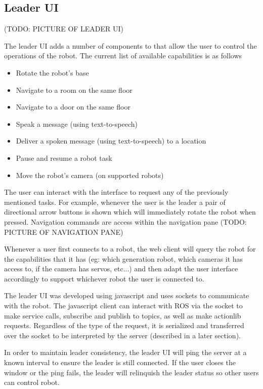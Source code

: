 \documentclass[
  oneside,
  11pt, a4paper,
  footinclude=true,
  headinclude=true,
  cleardoublepage=empty
]{article}
\begin{document}
\subsection{Leader UI}

(TODO: PICTURE OF LEADER UI)

The leader UI adds a number of components to that allow the user to
control the operations of the robot. The current list of available capabilities
is as follows

\begin{itemize}
  \item Rotate the robot's base
  \item Navigate to a room on the same floor
  \item Navigate to a door on the same floor
  \item Speak a message (using text-to-speech)
  \item Deliver a spoken message (using text-to-speech) to a location
  \item Pause and resume a robot task
  \item Move the robot's camera (on supported robots)
\end{itemize}

The user can interact with the interface to request any of the previously
mentioned tasks. For example, whenever the user is the leader a pair of
directional arrow buttons is shown which will immediately rotate the robot when
pressed. Navigation commands are access within the navigation pane (TODO:
PICTURE OF NAVIGATION PANE)

Whenever a user first connects to a robot, the web client will query the robot
for the capabilities that it has (eg: which generation robot, which cameras it
has access to, if the camera has servos, etc...) and then adapt the user
interface accordingly to support whichever robot the user is connected to.

The leader UI was developed using javascript and uses sockets to
communicate with the robot. The javascript client can interact with ROS via the
socket to make service calls, subscribe and publish to topics, as well as make
actionlib requests. Regardless of the type of the request, it is serialized and
transferred over the socket to be interpreted by the server (described in a
later section).

In order to maintain leader consistency, the leader UI will ping the server at
a known interval to ensure the leader is still connected. If the user closes
the window or the ping fails, the leader will relinquish the leader status so
other users can control robot.
\end{document}
